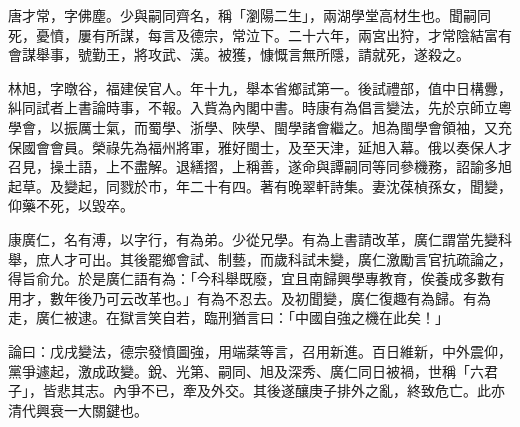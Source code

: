 \begin{pinyinscope}
唐才常，字佛塵。少與嗣同齊名，稱「瀏陽二生」，兩湖學堂高材生也。聞嗣同死，憂憤，屢有所謀，每言及德宗，常泣下。二十六年，兩宮出狩，才常陰結富有會謀舉事，號勤王，將攻武、漢。被獲，慷慨言無所隱，請就死，遂殺之。

林旭，字暾谷，福建侯官人。年十九，舉本省鄉試第一。後試禮部，值中日構釁，糾同試者上書論時事，不報。入貲為內閣中書。時康有為倡言變法，先於京師立粵學會，以振厲士氣，而蜀學、浙學、陜學、閩學諸會繼之。旭為閩學會領袖，又充保國會會員。榮祿先為福州將軍，雅好閩士，及至天津，延旭入幕。俄以奏保人才召見，操土語，上不盡解。退繕摺，上稱善，遂命與譚嗣同等同參機務，詔諭多旭起草。及變起，同戮於市，年二十有四。著有晚翠軒詩集。妻沈葆楨孫女，聞變，仰藥不死，以毀卒。

康廣仁，名有溥，以字行，有為弟。少從兄學。有為上書請改革，廣仁謂當先變科舉，庶人才可出。其後罷鄉會試、制藝，而歲科試未變，廣仁激勵言官抗疏論之，得旨俞允。於是廣仁語有為：「今科舉既廢，宜且南歸興學專教育，俟養成多數有用才，數年後乃可云改革也。」有為不忍去。及初聞變，廣仁復趣有為歸。有為走，廣仁被逮。在獄言笑自若，臨刑猶言曰：「中國自強之機在此矣！」

論曰：戊戌變法，德宗發憤圖強，用端棻等言，召用新進。百日維新，中外震仰，黨爭遽起，激成政變。銳、光第、嗣同、旭及深秀、廣仁同日被禍，世稱「六君子」，皆悲其志。內爭不已，牽及外交。其後遂釀庚子排外之亂，終致危亡。此亦清代興衰一大關鍵也。


\end{pinyinscope}